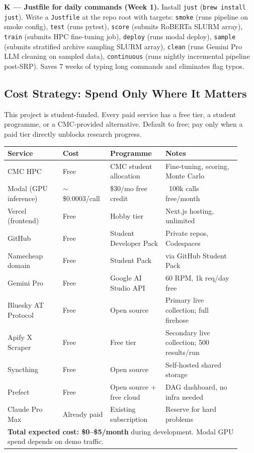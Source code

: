 \documentclass[11pt]{article}
\begin{document}
\textbf{K --- Justfile for daily commands (Week 1).}
Install \texttt{just} (\texttt{brew install just}). Write a \texttt{Justfile}
at the repo root with targets: \texttt{smoke} (runs pipeline on smoke config),
\texttt{test} (runs pytest), \texttt{score} (submits RoBERTa SLURM array),
\texttt{train} (submits HPC fine-tuning job), \texttt{deploy} (runs modal deploy),
\texttt{sample} (submits stratified archive sampling SLURM array),
\texttt{clean} (runs Gemini Pro LLM cleaning on sampled data),
\texttt{continuous} (runs nightly incremental pipeline post-SRP).
Saves 7 weeks of typing long commands and eliminates flag typos.

\subsection*{Cost Strategy: Spend Only Where It Matters}

This project is student-funded. Every paid service has a free tier, a student
programme, or a CMC-provided alternative. Default to free; pay only when a
paid tier directly unblocks research progress.

\begin{center}
\begin{tabular}{p{0.22\linewidth}p{0.18\linewidth}p{0.22\linewidth}p{0.30\linewidth}}
\toprule
\textbf{Service} & \textbf{Cost} & \textbf{Programme} & \textbf{Notes} \\
\midrule
CMC HPC & Free & CMC student allocation & Fine-tuning, scoring, Monte Carlo \\
Modal (GPU inference) & $\sim$\$0.0003/call & \$30/mo free credit & ~100k calls free/month \\
Vercel (frontend) & Free & Hobby tier & Next.js hosting, unlimited \\
GitHub & Free & Student Developer Pack & Private repos, Codespaces \\
Namecheap domain & Free & Student Pack & via GitHub Student Pack \\
Gemini Pro & Free & Google AI Studio API & 60 RPM, 1k req/day free \\
Bluesky AT Protocol & Free & Open source & Primary live collection; full firehose \\
Apify X Scraper & Free & Free tier & Secondary live collection; 500 results/run \\
Syncthing & Free & Open source & Self-hosted shared storage \\
Prefect & Free & Open source + free cloud & DAG dashboard, no infra needed \\
Claude Pro Max & Already paid & Existing subscription & Reserve for hard problems \\
\bottomrule
\multicolumn{4}{l}{\small \textbf{Total expected cost: \$0--\$5/month} during development.
  Modal GPU spend depends on demo traffic.} \\
\end{tabular}
\end{center}
\end{document}
